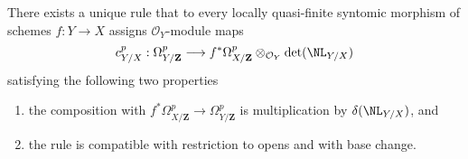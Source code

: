 \begin{lemma}
\label{lemma-Garel-upstairs}
There exists a unique rule that to every locally quasi-finite syntomic
morphism of schemes $f : Y \to X$ assigns $\mathcal{O}_Y$-module maps
$$
c^p_{Y/X} :
\Omega^p_{Y/\mathbf{Z}}
\longrightarrow
f^*\Omega^p_{X/\mathbf{Z}} \otimes_{\mathcal{O}_Y} \det(\NL_{Y/X})
$$
satisfying the following two properties
\begin{enumerate}
\item the composition with
$f^*\Omega^p_{X/\mathbf{Z}} \to \Omega^p_{Y/\mathbf{Z}}$
is multiplication by $\delta(\NL_{Y/X})$, and
\item the rule is compatible with restriction to opens and with
base change.
\end{enumerate}
\end{lemma}

